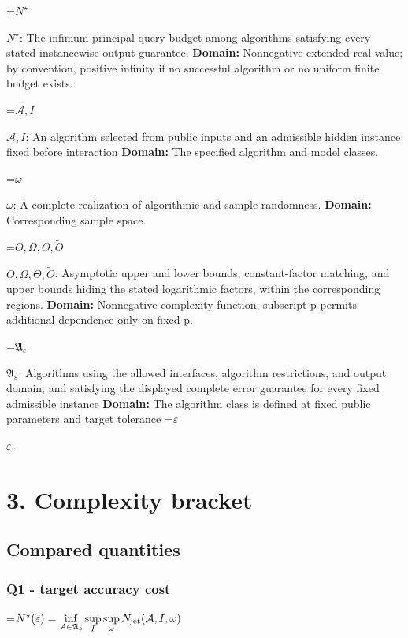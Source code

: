 \documentclass[10pt,a4paper]{article}
\newcommand{\AtlasMath}[1]{\par\begingroup\centering\setbox0=\hbox{$\displaystyle #1$}\ifdim\wd0>1.4\linewidth\typeout{ATLAS WIDE FORMULA: \the\wd0}\fi\ifdim\wd0>\linewidth\resizebox{\linewidth}{!}{\box0}\else\box0\fi\par\endgroup}
\newcommand{\AtlasInlineMath}[1]{\begingroup\setbox0=\hbox{$#1$}\ifdim\wd0>.4\linewidth\endgroup\AtlasMath{#1}\else\endgroup$#1$\fi}
\begin{document}
\AtlasInlineMath{N^\star}: The infimum principal query budget among algorithms satisfying every stated instancewise output guarantee. \textbf{Domain:} Nonnegative extended real value; by convention, positive infinity if no successful algorithm or no uniform finite budget exists.



\AtlasInlineMath{\mathcal A,I}: An algorithm selected from public inputs and an admissible hidden instance fixed before interaction \textbf{Domain:} The specified algorithm and model classes.



\AtlasInlineMath{\omega}: A complete realization of algorithmic and sample randomness. \textbf{Domain:} Corresponding sample space.



\AtlasInlineMath{O,\Omega,\Theta,\widetilde O}: Asymptotic upper and lower bounds, constant-factor matching, and upper bounds hiding the stated logarithmic factors, within the corresponding regions. \textbf{Domain:} Nonnegative complexity function; subscript p permits additional dependence only on fixed p.



\AtlasInlineMath{\mathfrak A_\varepsilon}: Algorithms using the allowed interfaces, algorithm restrictions, and output domain, and satisfying the displayed complete error guarantee for every fixed admissible instance \textbf{Domain:} The algorithm class is defined at fixed public parameters and target tolerance \AtlasInlineMath{\varepsilon}.



\section{3. Complexity bracket}


\subsection{Compared quantities}


\subsubsection{Q1 - target accuracy cost}


\AtlasMath{N^\star(\varepsilon)=\inf_{\mathcal A\in\mathfrak A_\varepsilon}\sup_I \sup_\omega N_{\rm jet}(\mathcal A,I,\omega)}
\end{document}
